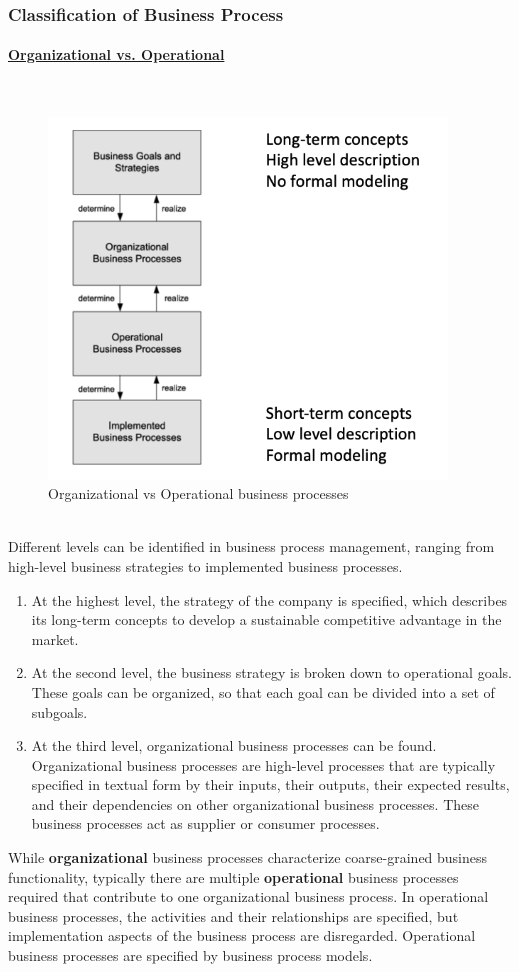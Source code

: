 \documentclass[10pt,a4paper]{article}
\newcommand{\myparagraph}[1]{\paragraph{\uline{#1}}\mbox{}\\[0.05in]}
\begin{document}
\subsubsection{Classification of Business Process}
\myparagraph{Organizational vs. Operational}
\begin{figure}[ht!]
 \hfill \includegraphics[width=300pt]{images/org-vs-op}\hspace*{\fill}
 \caption{Organizational vs Operational business processes}
  \label{fig:example-blueprint}
\end{figure}\\
Different levels can be identified in business process management, ranging from high-level business strategies to implemented business processes.
\begin{enumerate}
	\item At the highest level, the strategy of the company is specified, which describes its long-term concepts to develop a sustainable competitive advantage in the market.
	\item At the second level, the business strategy is broken down to operational goals. These goals can be organized, so that each goal can be divided into a set of subgoals.
	\item At the third level, organizational business processes can be found. Organizational business processes are high-level processes that are typically specified in textual form by their inputs, their outputs, their expected results, and their dependencies on other organizational business processes. These business processes act as supplier or consumer processes.
\end{enumerate} 
While \textbf{organizational} business processes characterize coarse-grained business functionality, typically there are multiple \textbf{operational} business processes required that contribute to one organizational business process. In operational business processes, the activities and their relationships are specified, but implementation aspects of the business process are disregarded. Operational business processes are specified by business process models.\\
\end{document}
